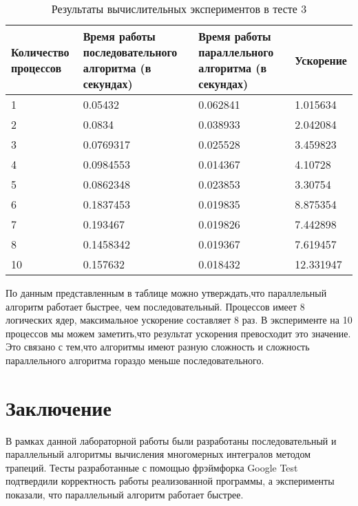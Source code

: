 \documentclass{report}
\begin{document}
\begin{table}[!h]
\caption{Результаты вычислительных экспериментов в тесте 3}
\centering
\begin{tabular}{| p{2cm} | p{3cm} | p{4cm} | p{2cm} |}
\hline
Количество процессов & Время работы последовательного алгоритма (в секундах) & Время работы параллельного алгоритма (в секундах) & Ускорение  \\[5pt]
\hline
1        & 0.05432        & 0.062841    &1.015634       \\
2        & 0.0834      &0.038933   &  2.042084     \\
3        &  0.0769317      & 0.025528      &3.459823 \\
4        &  0.0984553       &  0.014367     & 4.10728     \\
5        &  0.0862348      & 0.023853   &   3.30754     \\
6        &  0.1837453      &   0.019835   &    8.875354    \\
7        &    0.193467      & 0.019826      &  7.442898     \\
8        &   0.1458342       &   0.019367  &   7.619457   \\
10       &    0.157632       &   0.018432  &   12.331947   \\
\hline
\end{tabular}
\end{table}

\par По данным представленным в таблице можно утверждать,что параллельный алгоритм работает быстрее, чем последовательный. Процессов имеет 8 логических ядер, максимальное ускорение составляет 8 раз. В эксперименте на 10 процессов мы можем заметить,что  результат ускорения превосходит это значение. Это связано с тем,что алгоритмы имеют разную сложность и сложность параллельного алгоритма гораздо меньше последовательного.
\newpage


\section*{Заключение}
В рамках данной лабораторной работы были разработаны последовательный и параллельный алгоритмы вычисления многомерных интегралов методом трапеций. Тесты разработанные с помощью  фрэймфорка Google Test подтвердили корректность работы реализованной программы, а  эксперименты показали, что параллельный алгоритм работает быстрее.
\newpage
\end{document}
